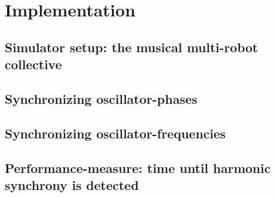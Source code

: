 	\chapter{Implementation}
		\section{Simulator setup: the musical multi-robot collective}
		\section{Synchronizing oscillator-phases}
		\section{Synchronizing oscillator-frequencies}
		\section{Performance-measure: time until harmonic synchrony is detected}
		\label{sec:performance_measure}

